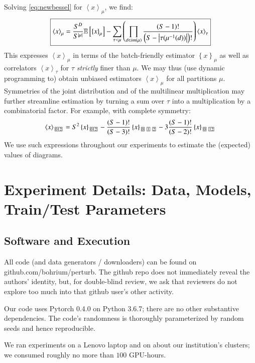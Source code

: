 \documentclass{article}
\theoremstyle{plain}
\theoremstyle{definition}
\newcommand{\expct}[1]{\mathbb{E}\left[#1\right]}
\newcommand{\wrap}[1]{\left(#1\right)}
\newcommand{\wang}[1]{\left\langle#1\right\rangle}
\newcommand{\wabs}[1]{\left|#1\right|}
\newcommand{\wurl}[1]{\left\{#1\right\}}
\newcommand{\partbox}[1]{
    \text{
        \fboxsep=0.5pt
        \tiny
        \fbox{#1}
    }
}
\begin{document}
    Solving \ref{eq:newbessel} for $\wang{x}_\mu$, we find:
    \begin{equation*}
        \text{\fbox{$
        \wang{x}_\mu
        =
        \frac{S^D}{S^{\wabs{\mu}}}
        \expct{
            \wurl{x}_\mu
        }
        -
        \sum_{\tau < \mu} \wrap{
            \prod_{d\in im(\mu)}
            \frac{\wrap{S-1}!}{\wrap{S-\wabs{\tau(\mu^{-1}(d))}}!}
        }
        \wang{x}_\tau
        $}}
    \end{equation*}
    This expresses $\wang{x}_\mu$ in terms of the batch-friendly estimator
    $\wurl{x}_\mu$ as well as correlators $\wang{x}_\tau$ for $\tau$ 
    \emph{strictly} finer than $\mu$.  We may thus (use dynamic programming to)
    obtain unbiased estimators $\wang{x}_\mu$ for all partitions $\mu$. 
    Symmetries of the joint distribution and of the multilinear multiplication
    may further streamline estimation by turning a sum over $\tau$ into a
    multiplication by a combinatorial factor.  For example, with complete
    symmetry:
    $$
        \wang{x}_{\partbox{012}}
        =
        S^2
        \wurl{x}_{\partbox{012}}
        -
        \frac{(S-1)!}{(S-3)!}
        \wurl{x}_{\partbox{0}\partbox{1}\partbox{2}}
        -
        3\frac{(S-1)!}{(S-2)!}
        \wurl{x}_{\partbox{0}\partbox{12}}
    $$
    We use such expressions throughout our experiments to estimate the
    (expected) values of diagrams.


\section{Experiment Details: Data, Models, Train/Test Parameters}\label{sect:landscape}
    \subsection{Software and Execution}
        All code (and data generators / downloaders) can be found on
        {\color{mooteal}github.com/bohrium/perturb}.  The github repo does not
        immediately reveal the authors' identity, but, for double-blind review,
        we ask that reviewers do not explore too much into that github user's
        other activity.

        Our code uses Pytorch 0.4.0 on Python 3.6.7; there are no other
        substantive dependencies.  The code's randomness is thoroughly
        parameterized by random seeds and hence reproducible.

        We ran experiments on a Lenovo laptop and on about our institution's
        clusters; we consumed roughly no more than $100$ GPU-hours.
\end{document}
